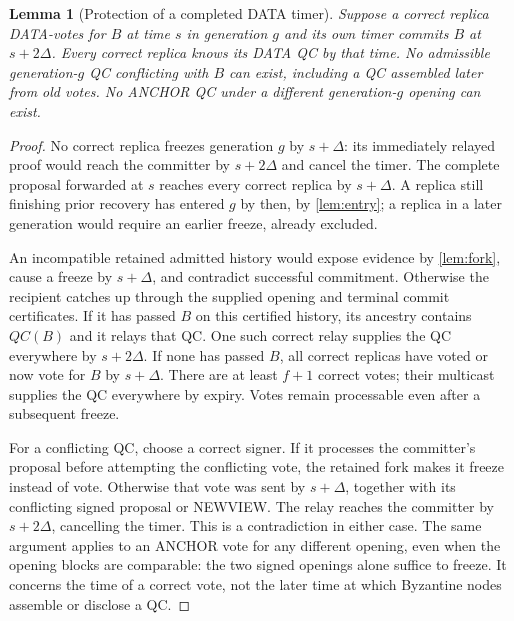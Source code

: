 \documentclass[11pt,a4paper]{article}
\newtheorem{lemma}[lemma]{Lemma}
\begin{document}
\begin{lemma}[Protection of a completed DATA timer]
\label{lem:timer}
Suppose a correct replica DATA-votes for $B$ at time $s$ in generation $g$
and its own timer commits $B$ at $s+2\Delta$. Every correct replica knows
its DATA QC by that time. No admissible generation-$g$ QC conflicting with
$B$ can exist, including a QC assembled later from old votes. No ANCHOR QC
under a different generation-$g$ opening can exist.
\end{lemma}
\begin{proof}
No correct replica freezes generation $g$ by $s+\Delta$: its immediately
relayed proof would reach the committer by $s+2\Delta$ and cancel the timer.
The complete proposal forwarded at $s$ reaches every correct replica by
$s+\Delta$. A replica still finishing prior recovery has entered $g$ by
then, by \cref{lem:entry}; a replica in a later generation would require
an earlier freeze, already excluded.

An incompatible retained admitted history would expose evidence by
\cref{lem:fork}, cause a freeze by $s+\Delta$, and contradict successful
commitment. Otherwise the recipient catches up through the supplied
opening and terminal commit certificates. If it has passed $B$ on this
certified history, its ancestry contains $QC(B)$ and it relays that QC.
One such correct relay supplies the QC everywhere by $s+2\Delta$.
If none has passed $B$, all correct replicas have voted or now vote for
$B$ by $s+\Delta$. There are at least $f+1$ correct votes; their multicast
supplies the QC everywhere by expiry. Votes remain processable even after
a subsequent freeze.

For a conflicting QC, choose a correct signer. If it processes the
committer's proposal before attempting the conflicting vote, the retained
fork makes it freeze instead of vote. Otherwise that vote was sent by
$s+\Delta$, together with its conflicting signed proposal or NEWVIEW.
The relay reaches the committer by $s+2\Delta$, cancelling the timer.
This is a contradiction in either case. The same argument applies to an
ANCHOR vote for any different opening, even when the opening blocks are
comparable: the two signed openings alone suffice to freeze. It concerns
the time of a correct vote, not the later time at which Byzantine nodes
assemble or disclose a QC.
\end{proof}
\end{document}
